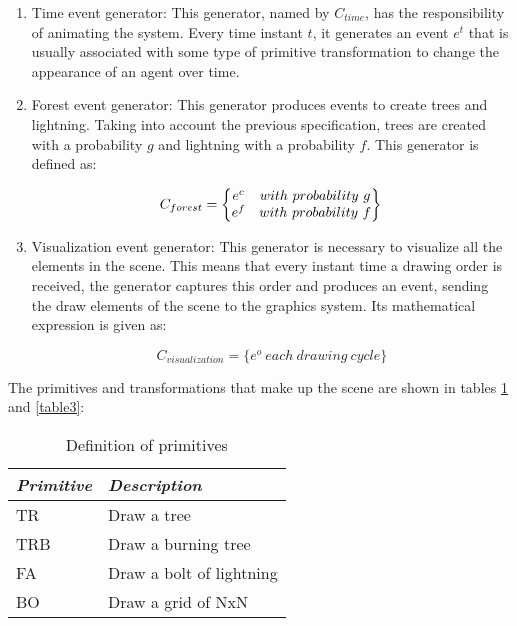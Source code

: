 \documentclass[runningheads]{llncs}
\begin{document}
\begin{enumerate}

\item Time event generator: 
This generator, named by $C_{time}$, has the responsibility of animating the system. Every time
instant $t$, it generates an event $e^t$ that is usually associated with some type of primitive
transformation to change the appearance of an agent over time.

\item Forest event generator:
This generator produces events to create trees and lightning. Taking into account the
previous specification, trees are created with a probability $g$ and lightning with a probability
$f$. This generator is defined as:

\[C_{forest}=
    \left\{
        \begin{matrix}
            e^{c} & with \ probability \ g \\
            e^{f} & with \ probability \ f
        \end{matrix}\right\}\\
\]

\item Visualization event generator:
This generator is necessary to visualize all the elements in the scene. This means that every
instant time a drawing order is received, the generator captures this order and produces an 
event, sending the draw elements of the scene to the graphics system. Its mathematical expression
is given as:

\[C_{visualization} = \{ e^o \ \mathit{each \ drawing \ cycle} \} \]
\end{enumerate}


The primitives and transformations that make up the scene are shown in tables \ref{table2} and
\ref{table3}:

\begin{table}[h]
\begin{center}
\begin{small}
\begin{tabular}{|l|l|}

	\hline \itshape Primitive & \itshape Description\\
	\hline TR & Draw a tree\\
	\hline TRB & Draw a burning tree\\
	\hline FA & Draw a bolt of lightning\\
	\hline BO & Draw a grid of NxN \\
	\hline

\end{tabular}
\end{small}
\caption{ \label{table2} Definition of primitives}
\end{center}
\end{table}
\end{document}
